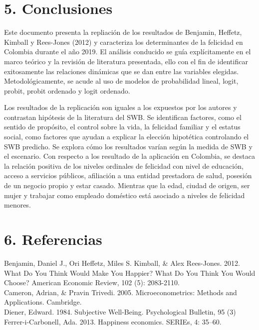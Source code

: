 \documentclass[12pt,spanish]{article}
\begin{document}
\section*{5. Conclusiones}

Este documento presenta la repliación de los resultados de Benjamin, Heffetz, Kimball y Rees-Jones (2012) y caracteriza los determinantes de la felicidad en Colombia durante el año 2019. El análisis conducido se guía explícitamente en el marco teórico y la revisión de literatura presentada, ello con el fin de identificar exitosamente las relaciones dinámicas que se dan entre
las variables elegidas. Metodológicamente, se acude al uso de  modelos de probabilidad lineal, logit, probit, probit ordenado y logit ordenado.

Los resultados de la replicación son iguales a los expuestos por los autores y contrastan hipótesis de la literatura del SWB. Se identifican factores, como el sentido de propósito, el control sobre la vida, la felicidad familiar y el estatus social, como factores que ayudan a explicar la elección hipotética controlando el SWB predicho. Se explora cómo los resultados varían según la medida de SWB y el escenario. Con respecto a los resultado de la aplicación en Colombia, se destaca la relación positiva de los niveles ordinales de felicidad con nivel de educación, acceso a servicios públicos, afiliación a una entidad prestadora de salud, posesión de un negocio propio y estar casado. Mientras que la edad, ciudad de origen, ser mujer y trabajar como empleado doméstico está asociado a niveles de felicidad menores.





\section*{6. Referencias} 
\indent Benjamin, Daniel J., Ori Heffetz, Miles S. Kimball, \& Alex Rees-Jones. 2012. What Do You Think Would Make You Happier? What Do You Think You Would Choose? American Economic Review, 102 (5): 2083-2110. \\

\indent Cameron, Adrian, \& Pravin Trivedi. 2005. Microeconometrics: Methods and Applications. Cambridge. \\

\indent Diener, Edward. 1984. Subjective Well-Being. Psychological Bulletin, 95 (3) \\

\indent Ferrer-i-Carbonell, Ada. 2013. Happiness economics. SERIEs, 4: 35–60.\\
\end{document}
